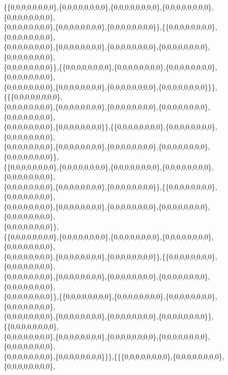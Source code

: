 \documentclass[a4paper,11pt]{jbook}
\theoremstyle{plain}
\theoremstyle{definition}
\theoremstyle{remark}
\theoremstyle{proof}
\numberwithin{equation}{section}
\begin{document}
\begin{doublespace}
\{\{0,0,0,0,0,0,0,0\},\{0,0,0,0,0,0,0,0\},\{0,0,0,0,0,0,0,0\},\{0,0,0,0,0,0,0,0\},\{0,0,0,0,0,0,0,0\}, \\
\{0,0,0,0,0,0,0,0\},\{0,0,0,0,0,0,0,0\},\{0,0,0,0,0,0,0,0\}\},\{\{0,0,0,0,0,0,0,0\},\{0,0,0,0,0,0,0,0\}, \\
\{0,0,0,0,0,0,0,0\},\{0,0,0,0,0,0,0,0\},\{0,0,0,0,0,0,0,0\},\{0,0,0,0,0,0,0,0\},\{0,0,0,0,0,0,0,0\},\\
\{0,0,0,0,0,0,0,0\}\},\{\{0,0,0,0,0,0,0,0\},\{0,0,0,0,0,0,0,0\},\{0,0,0,0,0,0,0,0\},\{0,0,0,0,0,0,0,0\}, \\
\{0,0,0,0,0,0,0,0\},\{0,0,0,0,0,0,0,0\},\{0,0,0,0,0,0,0,0\},\{0,0,0,0,0,0,0,0\}\}\},\{\{\{0,0,0,0,0,0,0,0\}, \\
\{0,0,0,0,0,0,0,0\},\{0,0,0,0,0,0,0,0\},\{0,0,0,0,0,0,0,0\},\{0,0,0,0,0,0,0,0\},\{0,0,0,0,0,0,0,0\},\\
\{0,0,0,0,0,0,0,0\},\{0,0,0,0,0,0,0,0\}\},\{\{0,0,0,0,0,0,0,0\},\{0,0,0,0,0,0,0,0\},\{0,0,0,0,0,0,0,0\}, \\
\{0,0,0,0,0,0,0,0\},\{0,0,0,0,0,0,0,0\},\{0,0,0,0,0,0,0,0\},\{0,0,0,0,0,0,0,0\},\{0,0,0,0,0,0,0,0\}\}, \\
\{\{0,0,0,0,0,0,0,0\},\{0,0,0,0,0,0,0,0\},\{0,0,0,0,0,0,0,0\},\{0,0,0,0,0,0,0,0\},\{0,0,0,0,0,0,0,0\}, \\
\{0,0,0,0,0,0,0,0\},\{0,0,0,0,0,0,0,0\},\{0,0,0,0,0,0,0,0\}\},\{\{0,0,0,0,0,0,0,0\},\{0,0,0,0,0,0,0,0\}, \\
\{0,0,0,0,0,0,0,0\},\{0,0,0,0,0,0,0,0\},\{0,0,0,0,0,0,0,0\},\{0,0,0,0,0,0,0,0\},\{0,0,0,0,0,0,0,0\},\\
\{0,0,0,0,0,0,0,0\}\}, \\
\{\{0,0,0,0,0,0,0,0\},\{0,0,0,0,0,0,0,0\},\{0,0,0,0,0,0,0,0\},\{0,0,0,0,0,0,0,0\},\{0,0,0,0,0,0,0,0\}, \\
\{0,0,0,0,0,0,0,0\},\{0,0,0,0,0,0,0,0\},\{0,0,0,0,0,0,0,0\}\},\{\{0,0,0,0,0,0,0,0\},\{0,0,0,0,0,0,0,0\}, \\
\{0,0,0,0,0,0,0,0\},\{0,0,0,0,0,0,0,0\},\{0,0,0,0,0,0,0,0\},\{0,0,0,0,0,0,0,0\},\{0,0,0,0,0,0,0,0\},\\
\{0,0,0,0,0,0,0,0\}\},\{\{0,0,0,0,0,0,0,0\},\{0,0,0,0,0,0,0,0\},\{0,0,0,0,0,0,0,0\},\{0,0,0,0,0,0,0,0\}, \\
\{0,0,0,0,0,0,0,0\},\{0,0,0,0,0,0,0,0\},\{0,0,0,0,0,0,0,0\},\{0,0,0,0,0,0,0,0\}\},\{\{0,0,0,0,0,0,0,0\}, \\
\{0,0,0,0,0,0,0,0\},\{0,0,0,0,0,0,0,0\},\{0,0,0,0,0,0,0,0\},\{0,0,0,0,0,0,0,0\},\{0,0,0,0,0,0,0,0\},\\
\{0,0,0,0,0,0,0,0\},\{0,0,0,0,0,0,0,0\}\}\},\{\{\{0,0,0,0,0,0,0,0\},\{0,0,0,0,0,0,0,0\},\{0,0,0,0,0,0,0,0\}, \\

\end{doublespace}
\end{document}
